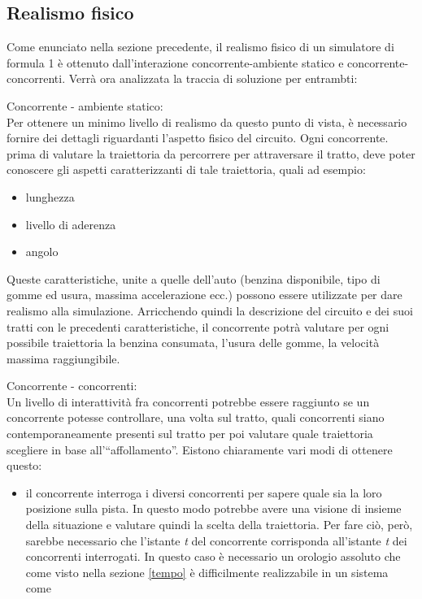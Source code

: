 \subsection{Realismo fisico}
Come enunciato nella sezione precedente, il realismo fisico di un simulatore di formula 1 è ottenuto dall'interazione
concorrente-ambiente statico e concorrente-concorrenti. Verrà ora analizzata la traccia di soluzione per entrambti:
\begin{description}
\item{Concorrente - ambiente statico:}\\
Per ottenere un minimo livello di realismo da questo punto di vista, è necessario fornire dei dettagli riguardanti l'aspetto fisico
del circuito. Ogni concorrente. prima di valutare la traiettoria da percorrere per attraversare il tratto, deve poter conoscere
gli aspetti caratterizzanti di tale traiettoria, quali ad esempio:
\begin{itemize}
\item lunghezza 
\item livello di aderenza
\item angolo
\end{itemize}
Queste caratteristiche, unite a quelle dell'auto (benzina disponibile, tipo di gomme ed usura, massima accelerazione ecc.)
possono essere utilizzate per dare realismo alla simulazione.
Arricchendo quindi la descrizione del circuito e dei suoi tratti con le precedenti caratteristiche, il concorrente potrà
valutare per ogni possibile traiettoria la benzina consumata, l'usura delle gomme, la velocità massima raggiungibile.
\item{Concorrente - concorrenti:}\\
Un livello di interattività fra concorrenti potrebbe essere raggiunto se 
un concorrente potesse controllare, una volta sul tratto, quali concorrenti siano contemporaneamente presenti sul tratto
per poi valutare quale traiettoria scegliere in base all'``affollamento''. Eistono chiaramente vari modi di ottenere questo:
\begin{itemize}
\item il concorrente interroga i diversi concorrenti per sapere quale sia la loro posizione sulla pista. In questo modo potrebbe
avere una visione di insieme della situazione e valutare quindi la scelta della traiettoria. Per fare ciò, però, sarebbe 
necessario che l'istante \emph{t} del concorrente corrisponda all'istante \emph{t} dei concorrenti interrogati. In questo caso
è necessario un orologio assoluto che come visto nella sezione \ref{tempo} è difficilmente realizzabile in un sistema come

\end{itemize}
\end{description}
